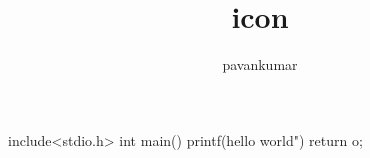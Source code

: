\documentclass[11pt,a4paper]{article}
\author{pavankumar}
\title{icon}
\begin{document}
include<stdio.h>
int main()
{
printf(hello world")
return o;
}
\end{document}
